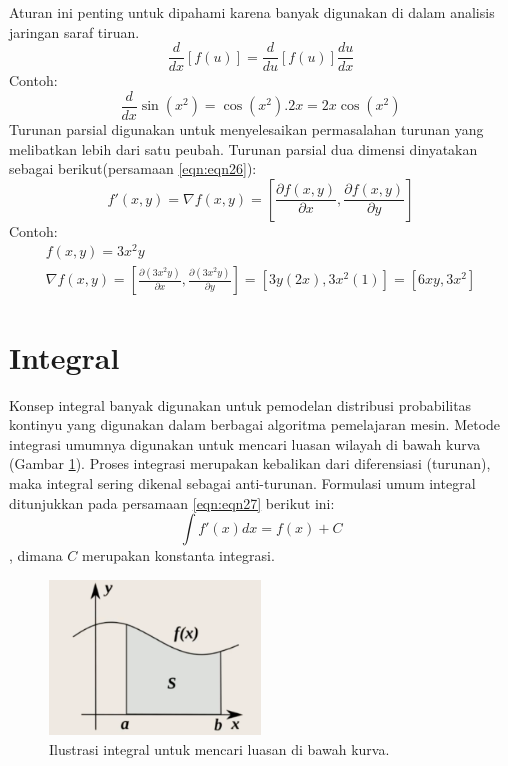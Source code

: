 Aturan ini penting untuk dipahami karena banyak digunakan di dalam analisis jaringan saraf tiruan.
\begin{equation}\label{eqn:eqn25}
    \frac{d}{{dx}}\left[ {f\left( u \right)} \right] = \frac{d}{{du}}\left[ {f\left( u \right)} \right]\frac{{du}}{{dx}}
\end{equation}
Contoh:
\begin{dmath*}
\frac{d}{dx}\sin{(x^{2})} = \cos{(x^2)}.2x = 2x\cos{(x^2)}
\end{dmath*}
Turunan parsial digunakan untuk menyelesaikan permasalahan turunan yang melibatkan lebih dari satu peubah. Turunan parsial dua dimensi dinyatakan sebagai berikut(persamaan \ref{eqn:eqn26}):
\begin{equation}\label{eqn:eqn26}
    f'(x,y) = \nabla f(x,y) = \left[\frac{\partial f(x,y)}{\partial x}, \frac{\partial f(x,y)}{\partial y}\right]  
\end{equation}
Contoh:
\begin{eqnarray*}
f(x,y) = 3x^{2}y\\
\nabla f(x,y) = \left[\frac{\partial(3x^{2}y)}{\partial x}, \frac{\partial (3x^{2}y)}{\partial y} \right] = \left[3y(2x), 3x^{2}(1)\right] = \left[6xy, 3x^{2}\right]
\end{eqnarray*}

\section{Integral}
Konsep integral banyak digunakan untuk pemodelan distribusi probabilitas kontinyu yang digunakan dalam berbagai algoritma pemelajaran mesin. Metode integrasi umumnya digunakan untuk mencari luasan wilayah di bawah kurva (Gambar \ref{fig:fig5}). Proses integrasi merupakan kebalikan dari diferensiasi (turunan), maka integral sering dikenal sebagai anti-turunan. Formulasi umum integral ditunjukkan pada persamaan \ref{eqn:eqn27} berikut ini:
\begin{equation}\label{eqn:eqn27}
\int f'(x) dx = f(x) + C
\end{equation}
, dimana $C$ merupakan konstanta integrasi.

\begin{figure}[H]
    \centering
    \includegraphics[width=0.5\textwidth]{gambar/gmb5.png}
    \caption{Ilustrasi integral untuk mencari luasan di bawah kurva.}
    \label{fig:fig5}
\end{figure}

